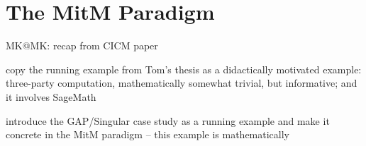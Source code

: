 \section{The MitM Paradigm}\label{sec:mitm}
\begin{todolist}{MK@MK: recap from CICM paper}
\item copy the running example from Tom's thesis as a didactically motivated example:
  three-party computation, mathematically somewhat trivial, but informative; and it
  involves SageMath
\item introduce the GAP/Singular case study as a running example and make it concrete in
  the MitM paradigm -- this example is mathematically
\end{todolist}



